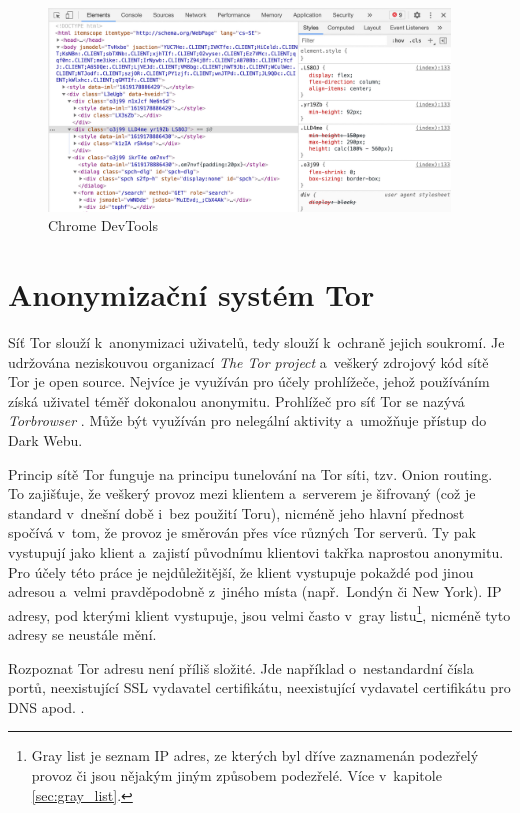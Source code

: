 \begin{figure}[hbt]
	\centering
	\includegraphics[width=0.95\textwidth]{images/chrome_devtools.jpg}
	\caption{Chrome DevTools}
	\label{img:chrome_devtools}
\end{figure}

\section{Anonymizační systém Tor}
\label{sec:tor_browser}
Síť Tor slouží k~anonymizaci uživatelů, tedy slouží k~ochraně jejich soukromí. Je udržována neziskouvou organizací \textit{The Tor project} a~veškerý zdrojový kód sítě Tor je open source. Nejvíce je využíván pro účely prohlížeče, jehož používáním získá uživatel téměř dokonalou anonymitu. Prohlížeč pro síť Tor se nazývá \textit{Torbrowser} \cite{bib:tor_browser}. Může být využíván pro nelegální aktivity a~umožňuje přístup do Dark Webu.

Princip sítě Tor funguje na principu tunelování na Tor síti, tzv. Onion routing. To zajišťuje, že veškerý provoz mezi klientem a~serverem je šifrovaný (což je standard v~dnešní době i~bez použití Toru), nicméně jeho hlavní přednost spočívá v~tom, že provoz je směrován přes více různých Tor serverů. Ty pak vystupují jako klient a~zajistí původnímu klientovi takřka naprostou anonymitu. Pro účely této práce je nejdůležitější, že klient vystupuje pokaždé pod jinou adresou a~velmi pravděpodobně z~jiného místa (např.~Londýn či New York). IP adresy, pod kterými klient vystupuje, jsou velmi často v~gray listu\footnote{Gray list je seznam IP adres, ze kterých byl dříve zaznamenán podezřelý provoz či jsou nějakým jiným způsobem podezřelé. Více v~kapitole \ref{sec:gray_list}.}, nicméně tyto adresy se neustále mění. 

Rozpoznat Tor adresu není příliš složité. Jde například o~nestandardní čísla portů, neexistující SSL vydavatel certifikátu, neexistující vydavatel certifikátu pro DNS apod. \cite{bib:tor_recognition}.

